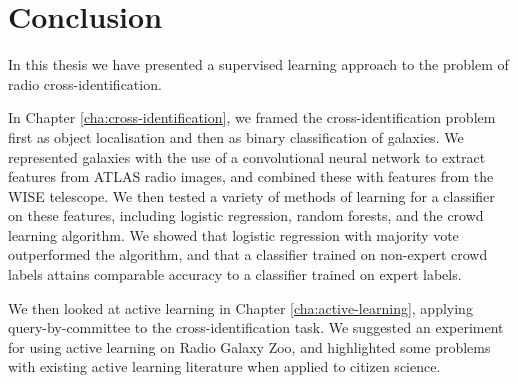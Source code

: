 
\chapter{Conclusion}
\label{cha:conclusion}

    In this thesis we have presented a supervised learning approach to the
    problem of radio cross-identification.

    In Chapter \ref{cha:cross-identification}, we framed the
    cross-identification problem first as object localisation and then as binary
    classification of galaxies. We represented galaxies with the use of a
    convolutional neural network to extract features from ATLAS radio images,
    and combined these with features from the WISE telescope. We then tested a
    variety of methods of learning for a classifier on these features, including
    logistic regression, random forests, and the \citet{raykar10} crowd learning
    algorithm. We showed that logistic regression with majority vote
    outperformed the \citeauthor{raykar10} algorithm, and that a classifier
    trained on non-expert crowd labels attains comparable accuracy to a
    classifier trained on expert labels.

    We then looked at active learning in Chapter \ref{cha:active-learning},
    applying query-by-committee to the cross-identification task. We suggested
    an experiment for using active learning on Radio Galaxy Zoo, and highlighted
    some problems with existing active learning literature when applied to
    citizen science.

